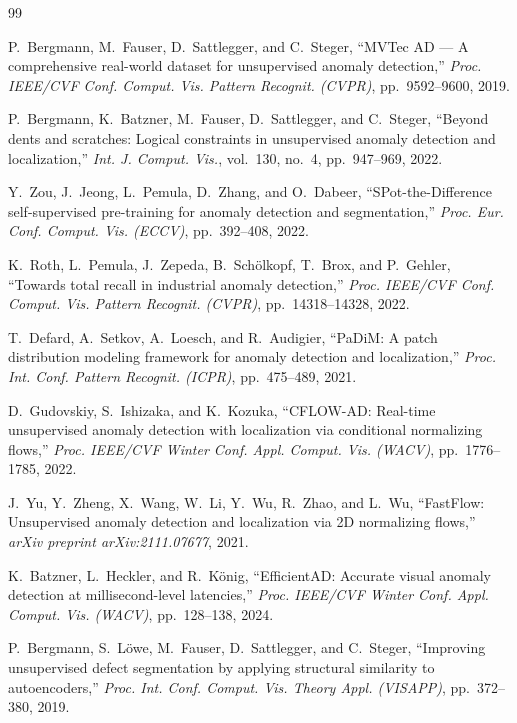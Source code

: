 \documentclass[journal]{IEEEtran}
\begin{document}
\begin{thebibliography}{99}

P.~Bergmann, M.~Fauser, D.~Sattlegger, and C.~Steger,
``MVTec AD — A comprehensive real-world dataset for unsupervised anomaly detection,''
\textit{Proc. IEEE/CVF Conf. Comput. Vis. Pattern Recognit. (CVPR)}, pp.~9592--9600, 2019.

P.~Bergmann, K.~Batzner, M.~Fauser, D.~Sattlegger, and C.~Steger,
``Beyond dents and scratches: Logical constraints in unsupervised anomaly detection and localization,''
\textit{Int. J. Comput. Vis.}, vol.~130, no.~4, pp.~947--969, 2022.

Y.~Zou, J.~Jeong, L.~Pemula, D.~Zhang, and O.~Dabeer,
``SPot-the-Difference self-supervised pre-training for anomaly detection and segmentation,''
\textit{Proc. Eur. Conf. Comput. Vis. (ECCV)}, pp.~392--408, 2022.

K.~Roth, L.~Pemula, J.~Zepeda, B.~Sch\"{o}lkopf, T.~Brox, and P.~Gehler,
``Towards total recall in industrial anomaly detection,''
\textit{Proc. IEEE/CVF Conf. Comput. Vis. Pattern Recognit. (CVPR)}, pp.~14318--14328, 2022.

T.~Defard, A.~Setkov, A.~Loesch, and R.~Audigier,
``PaDiM: A patch distribution modeling framework for anomaly detection and localization,''
\textit{Proc. Int. Conf. Pattern Recognit. (ICPR)}, pp.~475--489, 2021.

D.~Gudovskiy, S.~Ishizaka, and K.~Kozuka,
``CFLOW-AD: Real-time unsupervised anomaly detection with localization via conditional normalizing flows,''
\textit{Proc. IEEE/CVF Winter Conf. Appl. Comput. Vis. (WACV)}, pp.~1776--1785, 2022.

J.~Yu, Y.~Zheng, X.~Wang, W.~Li, Y.~Wu, R.~Zhao, and L.~Wu,
``FastFlow: Unsupervised anomaly detection and localization via 2D normalizing flows,''
\textit{arXiv preprint arXiv:2111.07677}, 2021.

K.~Batzner, L.~Heckler, and R.~K\"{o}nig,
``EfficientAD: Accurate visual anomaly detection at millisecond-level latencies,''
\textit{Proc. IEEE/CVF Winter Conf. Appl. Comput. Vis. (WACV)}, pp.~128--138, 2024.

P.~Bergmann, S.~L\"{o}we, M.~Fauser, D.~Sattlegger, and C.~Steger,
``Improving unsupervised defect segmentation by applying structural similarity to autoencoders,''
\textit{Proc. Int. Conf. Comput. Vis. Theory Appl. (VISAPP)}, pp.~372--380, 2019.


\end{thebibliography}
\end{document}
